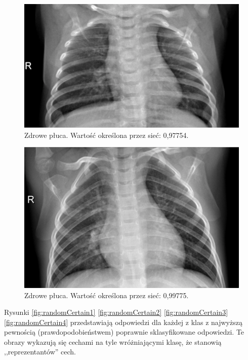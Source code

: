 \documentclass[12pt,a4paper,twoside,titlepage,openright]{book}
\begin{document}
\begin{figure}[ht]
	\centering
			\includegraphics[resolution=100, scale=0.3]{randomIncorrect3.png}
		\caption{Zdrowe płuca. Wartość określona przez sieć: 0,97754.}
				\label{fig:randomIncorrect3}
\end{figure}

\begin{figure}[ht]
	\centering
			\includegraphics[resolution=100, scale=0.3]{randomIncorrect4.png}
		\caption{Zdrowe płuca. Wartość określona przez sieć: 0,99775.}
				\label{fig:randomIncorrect4}
\end{figure}

Rysunki \ref{fig:randomCertain1} \ref{fig:randomCertain2} \ref{fig:randomCertain3} \ref{fig:randomCertain4} przedstawiają odpowiedzi dla każdej z klas z najwyższą pewnością (prawdopodobieństwem) poprawnie sklasyfikowane odpowiedzi. Te obrazy wykazują się cechami na tyle wróżniającymi klasę, że stanowią ,,reprezentantów'' cech.
\end{document}
